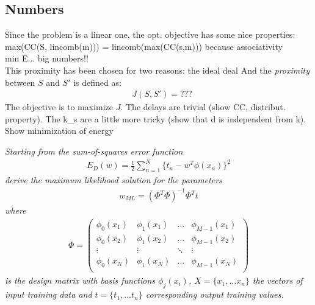 \documentclass[11pt]{scrartcl} %
\begin{document}
  \subsection*{Numbers}
  Since the problem is a linear one, the opt. objective has some nice properties:\\
  max(CC(S, lincomb(m))) = lincomb(max(CC(s,m))) because associativity\\
  min E... big numbers!!\\
  This proximity has been chosen for two reasons: the ideal deal
  And the {\it proximity} between \(S\) and \(S'\) is defined as:
  \begin{align*}
    &J(S, S') = ???
  \end{align*}
  The objective is to maximize \(J\). The delays are trivial (show CC, distribut. property). The k_s are a little more tricky (show that d is independent from k). Show minimization of energy
  

         {\it Starting from the sum-of-squares error function
           \begin{align*}
             E_D(w) = \frac{1}{2}\sum_{n=1}^N\{t_n-w^T\phi(x_n)\}^2
           \end{align*}
           derive the maximum likelihood solution for the parameters
           \begin{align*}
             w_{ML} = (\Phi^T\Phi)^{-1}\Phi^Tt
           \end{align*}
           where
           \begin{align*}
             \Phi = \begin{pmatrix}
               \phi_0(x_1) & \phi_1(x_1) & ... & \phi_{M-1}(x_1) \\
               \phi_0(x_2) & \phi_1(x_2) & ... & \phi_{M-1}(x_2) \\
               \vdots & \vdots  & \ddots & \vdots \\
               \phi_0(x_N) & \phi_1(x_N) & ... & \phi_{M-1}(x_N) \\
             \end{pmatrix}
           \end{align*}
           is the design matrix with basis functions \(\phi_j(x_i)\), \(X=\{x_1, ... x_n\}\) the vectors
           of input training data and  \(t=\{t_1, ... t_n\}\) corresponding output training
           values.
           
           
           
         }
  
\end{document}
